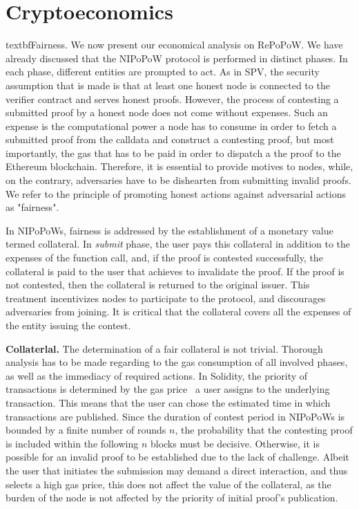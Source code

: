 \section{Cryptoeconomics}

textbf{Fairness.} We now present our economical analysis on RePoPoW. We have
already discussed that the NIPoPoW protocol is performed in distinct phases. In
each phase, different entities are prompted to act. As in SPV, the security
assumption that is made is that at least one honest node is connected to the
verifier contract and serves honest proofs. However, the process of contesting
a submitted proof by a honest node does not come without expenses.  Such an
expense is the computational power a node has to consume in order to fetch a
submitted proof from the calldata and construct a contesting proof, but most
importantly, the gas that has to be paid in order to dispatch a the proof to
the Ethereum blockchain. Therefore, it is essential to provide motives to
nodes, while, on the contrary, adversaries have to be dishearten from
submitting invalid proofs.  We refer to the principle of promoting honest
actions against adversarial actions as {"}fairness{"}.

In NIPoPoWs, fairness is addressed by the establishment of a monetary value
termed collateral. In \emph{submit} phase, the user pays this collateral in
addition to the expenses of the function call, and, if the proof is contested
successfully, the collateral is paid to the user that achieves to invalidate
the proof. If the proof is not contested, then the collateral is returned to
the original issuer. This treatment incentivizes nodes to participate to the
protocol, and discourages adversaries from joining. It is critical that the
collateral covers all the expenses of the entity issuing the contest.

\noindent \textbf{Collaterlal.} The determination of a fair collateral is not
trivial. Thorough analysis has to be made regarding to the gas consumption of
all involved phases, as well as the immediacy of required actions. In Solidity,
the priority of transactions is determined by the gas price~\cite{wood} a user assigns
to the underlying transaction. This means that the user can chose the estimated
time in which transactions are published. Since the duration of contest period
in NIPoPoWs is bounded by a finite number of rounds $n$, the probability that
the contesting proof is included within the following $n$ blocks must be
decisive. Otherwise, it is possible for an invalid proof to be established due
to the lack of challenge. Albeit the user that initiates the submission may
demand a direct interaction, and thus selects a high gas price, this does not
affect the value of the collateral, as the burden of the node is not affected
by the priority of initial proof's publication.

